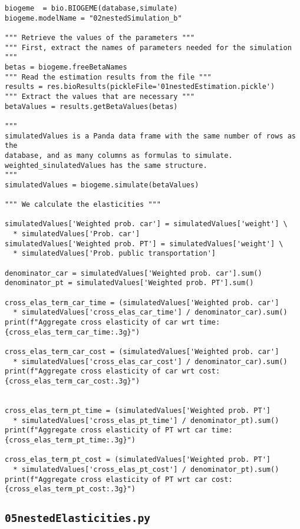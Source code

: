 \documentclass[12pt,a4paper]{article}
\begin{document}
\begin{lstlisting}[style=numbers]
biogeme  = bio.BIOGEME(database,simulate)
biogeme.modelName = "02nestedSimulation_b"

""" Retrieve the values of the parameters """
""" First, extract the names of parameters needed for the simulation """
betas = biogeme.freeBetaNames
""" Read the estimation results from the file """
results = res.bioResults(pickleFile='01nestedEstimation.pickle')
""" Extract the values that are necessary """
betaValues = results.getBetaValues(betas)

"""
simulatedValues is a Panda data frame with the same number of rows as the
database, and as many columns as formulas to simulate.
weighted_sinulatedValues has the same structure. 
"""
simulatedValues = biogeme.simulate(betaValues)

""" We calculate the elasticities """

simulatedValues['Weighted prob. car'] = simulatedValues['weight'] \
  * simulatedValues['Prob. car']
simulatedValues['Weighted prob. PT'] = simulatedValues['weight'] \
  * simulatedValues['Prob. public transportation']

denominator_car = simulatedValues['Weighted prob. car'].sum()
denominator_pt = simulatedValues['Weighted prob. PT'].sum()

cross_elas_term_car_time = (simulatedValues['Weighted prob. car']
  * simulatedValues['cross_elas_car_time'] / denominator_car).sum()
print(f"Aggregate cross elasticity of car wrt time: {cross_elas_term_car_time:.3g}")

cross_elas_term_car_cost = (simulatedValues['Weighted prob. car']
  * simulatedValues['cross_elas_car_cost'] / denominator_car).sum()
print(f"Aggregate cross elasticity of car wrt cost: {cross_elas_term_car_cost:.3g}")


cross_elas_term_pt_time = (simulatedValues['Weighted prob. PT']
  * simulatedValues['cross_elas_pt_time'] / denominator_pt).sum()
print(f"Aggregate cross elasticity of PT wrt car time: {cross_elas_term_pt_time:.3g}")

cross_elas_term_pt_cost = (simulatedValues['Weighted prob. PT']
  * simulatedValues['cross_elas_pt_cost'] / denominator_pt).sum()
print(f"Aggregate cross elasticity of PT wrt car cost: {cross_elas_term_pt_cost:.3g}")
\end{lstlisting}


\subsection{\lstinline$05nestedElasticities.py$}
\label{sec:05nestedElasticities}
\end{document}
